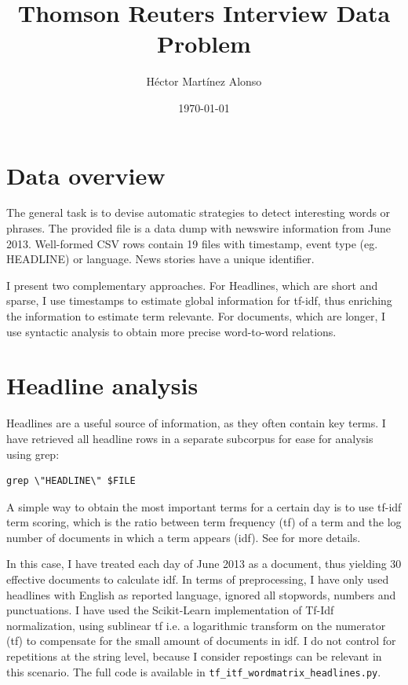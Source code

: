 \documentclass[12pt]{article}%
\begin{document}
\title{Thomson Reuters Interview Data Problem}
\author{Héctor Martínez Alonso}
\date{\today}
\maketitle
\section{Data overview}

The general task is to devise automatic strategies to detect interesting words or phrases.
The provided file is a data dump with newswire information from  June 2013. Well-formed CSV rows contain 19 files with timestamp, event type (eg. HEADLINE) or language. News stories have a unique identifier. 

I present two complementary approaches. For Headlines, which are short and sparse, I use timestamps to estimate global information for tf-idf, thus enriching the information to estimate term relevante. For documents, which are longer, I use syntactic analysis to obtain more precise word-to-word relations.

\section{Headline analysis}
\label{sec:tfidf}

Headlines are a useful source of information, as they often contain key terms. I have retrieved all headline rows in a separate subcorpus for ease for analysis using grep:
{\small
\begin{verbatim}
grep \"HEADLINE\" $FILE
\end{verbatim}}

A simple way to obtain the most important terms for a certain day is to use tf-idf term scoring, which is the ratio between term frequency (tf) of a term and the log number of documents in which a term appears (idf). See \cite{manning2008introduction} for more details.

In this case, I have treated each day of June 2013 as a document, thus yielding 30 effective documents to calculate idf. In terms of preprocessing, I have only used headlines with English as reported language, ignored all stopwords, numbers and punctuations. I have used the Scikit-Learn \cite{scikit-learn}
implementation of Tf-Idf normalization, using sublinear tf i.e. a logarithmic transform on the numerator (tf) to compensate for the small amount of documents in idf. I do not control for repetitions at the string level, because I consider repostings can be relevant in this scenario. The full code is available in \texttt{tf\_itf\_wordmatrix\_headlines.py}.
\end{document}
